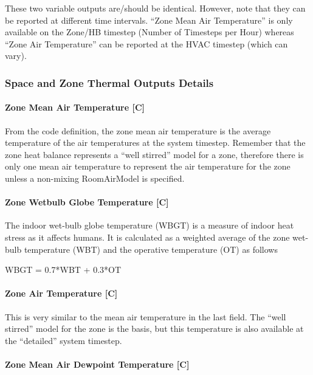 These two variable outputs are/should be identical. However, note that they can be reported at different time intervals. ``Zone Mean Air Temperature'' is only available on the Zone/HB timestep (Number of Timesteps per Hour) whereas ``Zone Air Temperature'' can be reported at the HVAC timestep (which can vary).

\subsubsection{Space and Zone Thermal Outputs Details}

\paragraph{Zone Mean Air Temperature {[}C{]}}\label{zone-mean-air-temperature-c}

From the code definition, the zone mean air temperature is the average temperature of the air temperatures at the system timestep. Remember that the zone heat balance represents a ``well stirred'' model for a zone, therefore there is only one mean air temperature to represent the air temperature for the zone unless a non-mixing RoomAirModel is specified.

\paragraph{Zone Wetbulb Globe Temperature {[}C{]}}\label{zone-wetbulb-globe-temperature-c}

The indoor wet-bulb globe temperature (WBGT) is a measure of indoor heat stress as it affects humans.
It is calculated as a weighted average of the zone wet-bulb temperature (WBT) and the operative temperature (OT) as follows

WBGT = 0.7*WBT + 0.3*OT

\paragraph{Zone Air Temperature {[}C{]}}\label{zone-air-temperature-c}

This is very similar to the mean air temperature in the last field. The ``well stirred'' model for the zone is the basis, but this temperature is also available at the ``detailed'' system timestep.

\paragraph{Zone Mean Air Dewpoint Temperature {[}C{]}}\label{zone-mean-air-dewpoint-temperature-c}

